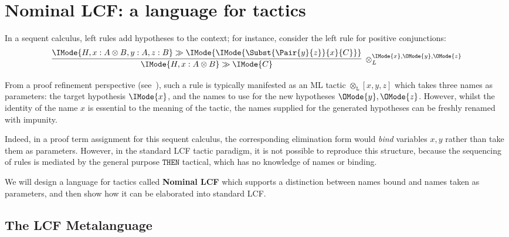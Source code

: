 \chapter{Nominal LCF: a language for tactics}

In a sequent calculus, left rules add hypotheses to the context; for instance,
consider the left rule for positive conjunctions:
\[
  \infer[{\otimes_L^{\IMode{x},\OMode{y},\OMode{z}}}]{
    \IMode{H,x:A\otimes B}\gg\IMode{C}
  }{
    \IMode{H,x:A\otimes B,y:A,z:B}\gg\IMode{
      \IMode{\Subst{\Pair{y}{z}}{x}{C}}
    }
  }
\]
%

From a proof refinement perspective (see~\cite{constable:1986}), such a rule is
typically manifested as an ML tactic $\mathtt{\otimes_L}[x,y,z]$ which takes
three names as parameters: the target hypothesis $\IMode{x}$, and the names to
use for the new hypotheses $\OMode{y},\OMode{z}$. However, whilst the identity
of the name $x$ is essential to the meaning of the tactic, the names supplied
for the generated hypotheses can be freshly renamed with impunity.

Indeed, in a proof term assignment for this sequent calculus, the corresponding
elimination form would \emph{bind} variables $x,y$ rather than take them as
parameters. However, in the standard LCF tactic paradigm, it is not possible to
reproduce this structure, because the sequencing of rules is mediated by the
general purpose $\mathtt{THEN}$ tactical, which has no knowledge of names or
binding.

We will design a language for tactics called \textbf{Nominal LCF} which
supports a distinction between names bound and names taken as parameters, and
then show how it can be elaborated into standard LCF.

\section{The LCF Metalanguage}
\newcommand\MLTypeDecl[1]{\mathtt{type}\ #1}
\newcommand\PartialFun[2]{#1\rightharpoonup #2}
\newcommand\LCFJudgment{\mathit{judgment}}
\newcommand\LCFEvidence{\mathit{evidence}}
\newcommand\LCFState{\mathit{state}}
\newcommand\LCFStateApply[2]{#1\star #2}
\newcommand\LCFTactic{\mathit{tactic}}
\newcommand\MLList[1]{#1\;\mathit{list}}
\newcommand\MLAtom{\mathbb{A}}
\newcommand\MLNat{\mathbb{N}}
\newcommand\MLStream[1]{{#1}^{\MLNat}}
\newcommand\MLPair[2]{\left(#1, #2\right)}
\newcommand\LCFNominalTactic{\MLStream{\MLAtom}\to\LCFTactic}
\newcommand\StreamTake[2]{\bar{#1}[#2]}
\newcommand\StreamChop[2]{[#2]\bar{#1}}
\newcommand\MLListSplit[2]{\mathsf{split}(#1, #2)}
\newcommand\LCFStateSplit[4]{\mathsf{split}_{#1}^{#2}(#4, #3)}
\DeclarePairedDelimiter{\MLLength}{\lVert}{\rVert}


